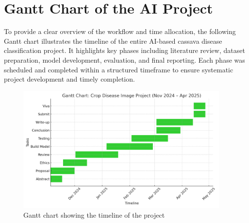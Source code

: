 \section{Gantt Chart of the AI Project}

To provide a clear overview of the workflow and time allocation, the following Gantt chart illustrates the timeline of the entire AI-based cassava disease classification project. It highlights key phases including literature review, dataset preparation, model development, evaluation, and final reporting. Each phase was scheduled and completed within a structured timeframe to ensure systematic project development and timely completion.

\begin{figure}[H]
    \centering
    \includegraphics[width=0.95\textwidth]{figures/gantt_chart_project_limegreen.png}
    \caption{Gantt chart showing the timeline of the project}
    \label{fig:gantt_chart}
\end{figure}
